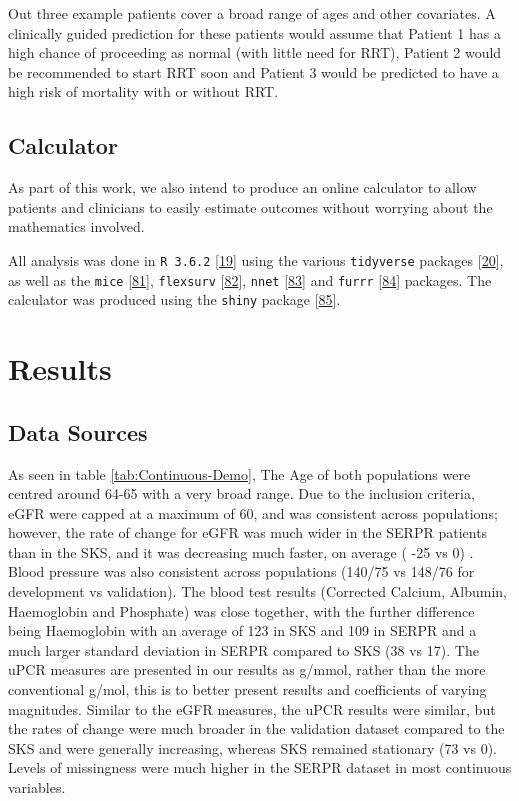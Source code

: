 \documentclass[12pt,PhD,twoside,openright]{muthesis}
\begin{document}
Out three example patients cover a broad range of ages and other covariates. A clinically guided prediction for these patients would assume that Patient 1 has a high chance of proceeding as normal (with little need for RRT), Patient 2 would be recommended to start RRT soon and Patient 3 would be predicted to have a high risk of mortality with or without RRT.

\hypertarget{calculator}{%
\subsection{Calculator}\label{calculator}}

As part of this work, we also intend to produce an online calculator to allow patients and clinicians to easily estimate outcomes without worrying about the mathematics involved.

All analysis was done in \texttt{R\ 3.6.2} {[}\protect\hyperlink{ref-r_core_team_r_nodate}{19}{]} using the various \texttt{tidyverse} packages {[}\protect\hyperlink{ref-wickham_tidy_2017}{20}{]}, as well as the \texttt{mice} {[}\protect\hyperlink{ref-buuren_mice_2011-1}{81}{]}, \texttt{flexsurv} {[}\protect\hyperlink{ref-jackson_flexsurv_nodate}{82}{]}, \texttt{nnet} {[}\protect\hyperlink{ref-ripley_package_2016}{83}{]} and \texttt{furrr} {[}\protect\hyperlink{ref-vaughan_furrr_2018}{84}{]} packages. The calculator was produced using the \texttt{shiny} package {[}\protect\hyperlink{ref-chang_shiny_2020}{85}{]}.

\hypertarget{results-5}{%
\section{Results}\label{results-5}}

\hypertarget{data-sources-1}{%
\subsection{Data Sources}\label{data-sources-1}}

As seen in table \ref{tab:Continuous-Demo}, The Age of both populations were centred around 64-65 with a very broad range. Due to the inclusion criteria, eGFR were capped at a maximum of 60, and was consistent across populations; however, the rate of change for eGFR was much wider in the SERPR patients than in the SKS, and it was decreasing much faster, on average ( -25 vs 0) . Blood pressure was also consistent across populations (140/75 vs 148/76 for development vs validation). The blood test results (Corrected Calcium, Albumin, Haemoglobin and Phosphate) was close together, with the further difference being Haemoglobin with an average of 123 in SKS and 109 in SERPR and a much larger standard deviation in SERPR compared to SKS (38 vs 17). The uPCR measures are presented in our results as g/mmol, rather than the more conventional g/mol, this is to better present results and coefficients of varying magnitudes. Similar to the eGFR measures, the uPCR results were similar, but the rates of change were much broader in the validation dataset compared to the SKS and were generally increasing, whereas SKS remained stationary (73 vs 0). Levels of missingness were much higher in the SERPR dataset in most continuous variables.
\end{document}
